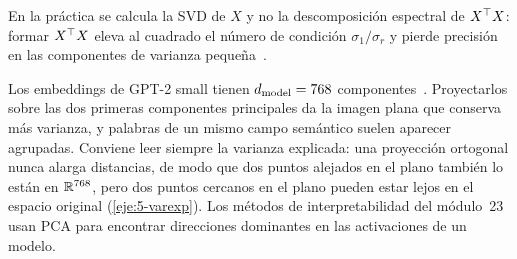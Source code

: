 \addtocounter{definicion}{1}%

\begin{observacion}
En la práctica se calcula la SVD de $X$ y no la descomposición espectral de $X^{\top} X$: formar $X^{\top} X$ eleva al cuadrado el número de condición $\sigma_1/\sigma_r$ y pierde precisión en las componentes de varianza pequeña~\cite[§10.4]{mml}.
\end{observacion}

\begin{observacion}
Los embeddings de GPT-2 small tienen $d_{\mathrm{model}}=768$ componentes~\cite{gpt2}. Proyectarlos sobre las dos primeras componentes principales da la imagen plana que conserva más varianza, y palabras de un mismo campo semántico suelen aparecer agrupadas. Conviene leer siempre la varianza explicada: una proyección ortogonal nunca alarga distancias, de modo que dos puntos alejados en el plano también lo están en $\mathbb{R}^{768}$, pero dos puntos cercanos en el plano pueden estar lejos en el espacio original (\cref{eje:5-varexp}). Los métodos de interpretabilidad del módulo~23 usan PCA para encontrar direcciones dominantes en las activaciones de un modelo.
\end{observacion}

